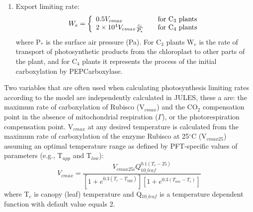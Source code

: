\documentclass[twoside,10pt]{report}
\begin{document}
\begin{enumerate}
 \item Export limiting rate:
\begin{equation}\label{eq:we}
  W_e = \left\{
  \begin{array}{l l}
    0.5 V_{cmax} & \quad \textrm{for C$_3$ plants}\\
    2 \times 10^4 V_{cmax}\frac{c_i}{P_{*}} & 
     \quad \textrm {for C$_4$ plants}
  \end{array}\right.
 \end{equation}
\noindent where P$_{*}$ is the surface air pressure (Pa). For C$_3$ plants W$_e$ is the rate of transport of photosynthetic products from the chloroplast to other parts of the plant, and for C$_4$ plants it represents the process of the initial carboxylation by PEPCarboxylase.
\end{enumerate}

Two variables that are often used when calculating photosynthesis limiting rates according to the \citet{Farquhar1980} model are independently calculated in JULES, these a are: the maximum rate of carboxylation of Rubisco (V$_{cmax}$) and the CO$_2$ compensation point in the absence of mitochondrial respiration ($\varGamma$), or the photorespiration compensation point. V$_{cmax}$ at any desired temperature is calculated from the maximum rate of carboxylation of the enzyme Rubisco at 25$^{\circ}$C (V$_{cmax25}$) assuming an optimal temperature range as defined by PFT-specific values of parameters (e.g., T$_{upp}$ and T$_{low}$):
\begin{equation}\label{vcmax_T_eq}
 V_{cmax}=\frac{V_{cmax25i} Q_{10{\_}leaf}^{0.1(T_c-25)}}{\left[1+e^{0.3(T_c-T_{upp})}\right]\left[1+e^{0.3(T_{low}-T_c)}\right]}
\end{equation}
\noindent where T$_c$ is canopy (leaf) temperature and Q$_{10{\_}leaf}$ is a temperature dependent function with default value equals 2. 
\end{document}
